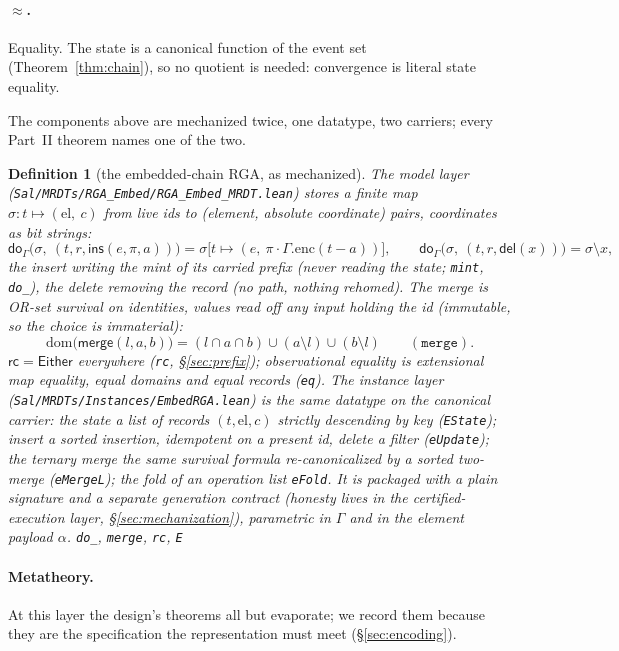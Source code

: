 \documentclass[11pt]{article}
\newtheorem{definition}[theorem]{Definition}
\newcommand{\rcrel}{\mathsf{rc}}                 %
\newcommand{\lean}[1]{\texttt{#1}}
\newcommand{\dodo}{\mathsf{do}}
\newcommand{\merge}{\mathsf{merge}}
\newcommand{\code}[1]{\texttt{#1}}
\newcommand{\del}{\mathsf{del}}
\newcommand{\ins}{\mathsf{ins}}
\newcommand{\Either}{\textsf{Either}}
\begin{document}
\paragraph{$\approx$.} Equality. The state is a canonical function of
the event set (Theorem~\ref{thm:chain}), so no quotient is needed:
convergence is literal state equality.

The components above are mechanized twice, one datatype, two
carriers; every Part~II theorem names one of the two.

\begin{definition}[the embedded-chain RGA, as mechanized]
\label{def:embed}
\emph{The model layer}
(\code{Sal/MRDTs/RGA\_Embed/RGA\_Embed\_MRDT.lean}) stores a finite
map $\sigma : t \mapsto (\mathrm{el},\ c)$ from live ids to (element,
absolute coordinate) pairs, coordinates as bit strings:
\[
  \dodo_\Gamma\bigl(\sigma,\ (t, r, \ins(e, \pi, a))\bigr)
  = \sigma\bigl[t \mapsto (e,\ \pi \cdot \Gamma.\mathrm{enc}(t -
  a))\bigr],
  \qquad
  \dodo_\Gamma\bigl(\sigma,\ (t, r, \del(x))\bigr) = \sigma \setminus x ,
\]
the insert writing the \emph{mint} of its carried prefix (never
reading the state; \lean{mint}, \lean{do\_}), the delete removing the
record (no path, nothing rehomed). The merge is OR-set survival on
identities, values read off any input holding the id (immutable, so
the choice is immaterial):
\[
  \mathrm{dom}\bigl(\merge(l, a, b)\bigr)
  = (l \cap a \cap b) \cup (a \setminus l) \cup (b \setminus l)
  \qquad (\lean{merge}) .
\]
$\rcrel = \Either$ everywhere (\lean{rc}, \S\ref{sec:prefix});
observational equality is extensional map equality, equal domains and
equal records (\lean{eq}). \emph{The instance layer}
(\code{Sal/MRDTs/Instances/EmbedRGA.lean})
is the same datatype on the canonical carrier: the state a list of
records $(t, \mathrm{el}, c)$ strictly descending by key
(\lean{EState}); insert a sorted insertion, idempotent on a present
id, delete a filter (\lean{eUpdate}); the ternary merge the same
survival formula re-canonicalized by a sorted two-merge
(\lean{eMergeL}); the fold of an operation list \lean{eFold}. It is
packaged with a plain signature and a separate generation contract (honesty
lives in the certified-execution layer, \S\ref{sec:mechanization}), parametric
in $\Gamma$ and in the element payload $\alpha$.
\hfill\lean{do\_}, \lean{merge}, \lean{rc}, \lean{E}
\end{definition}

\paragraph{Metatheory.} At this
layer the design's theorems all but evaporate; we record them because
they are the specification the representation must meet
(\S\ref{sec:encoding}).
\end{document}
